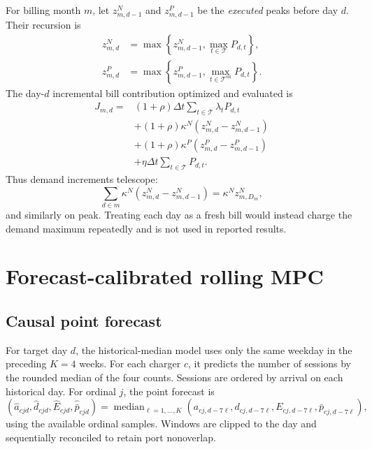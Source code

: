 \documentclass[11pt]{article}
\newcommand{\T}{\mathcal{T}}
\begin{document}
For billing month \(m\), let \(z^N_{m,d-1}\) and \(z^P_{m,d-1}\) be the
\emph{executed} peaks before day \(d\).  Their recursion is
\begin{subequations}\label{eq:peakstate}
\begin{align}
 z^N_{m,d}&=\max\!\left\{z^N_{m,d-1},\max_{t\in\T}P_{d,t}\right\},\\
 z^P_{m,d}&=\max\!\left\{z^P_{m,d-1},
                  \max_{t\in\T^{\mathrm{on}}}P_{d,t}\right\}.
\end{align}
\end{subequations}
The day-\(d\) incremental bill contribution optimized and evaluated is
\begin{align}
 J_{m,d}={}&(1+\rho)\Delta t
     \sum_{t\in\T}\lambda_tP_{d,t}\nonumber\\
 &+(1+\rho)\kappa^N(z^N_{m,d}-z^N_{m,d-1})\nonumber\\
 &+(1+\rho)\kappa^P(z^P_{m,d}-z^P_{m,d-1})\nonumber\\
 &+\eta\Delta t\sum_{t\in\T}P_{d,t}.                \label{eq:cost}
\end{align}
Thus demand increments telescope:
\[
 \sum_{d\in m}\kappa^N(z^N_{m,d}-z^N_{m,d-1})
 =\kappa^N z^N_{m,D_m},
\]
and similarly on peak.  Treating each day as a fresh bill would instead charge
the demand maximum repeatedly and is not used in reported results.

\section{Forecast-calibrated rolling MPC}
\subsection{Causal point forecast}

For target day \(d\), the historical-median model uses only the same weekday in
the preceding \(K=4\) weeks.  For each charger \(c\), it predicts the number of
sessions by the rounded median of the four counts.  Sessions are ordered by
arrival on each historical day.  For ordinal \(j\), the point forecast is
\begin{equation}
 (\widehat a_{cjd},\widehat d_{cjd},\widehat E_{cjd},
 \widehat{\bar p}_{cjd})
 =\operatorname{median}_{\ell=1,\ldots,K}
 (a_{cj,d-7\ell},d_{cj,d-7\ell},E_{cj,d-7\ell},
 \bar p_{cj,d-7\ell}),                              \label{eq:median}
\end{equation}
using the available ordinal samples.  Windows are clipped to the day and
sequentially reconciled to retain port nonoverlap.
\end{document}
